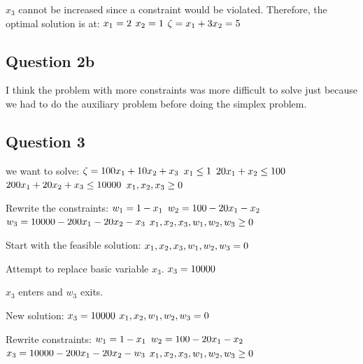 \documentclass[17pt]{extarticle}
\begin{document}
\bigskip $x_3$ cannot be increased since a constraint would be violated. Therefore, the optimal solution is at:
$\\ x_1 = 2$
$\\ x_2 = 1$
$\\ \zeta = x_1 + 3x_2 = 5$


\newpage
\subsection*{Question 2b}
I think the problem with more constraints was more difficult to solve just because we had to do the auxiliary problem before doing the simplex problem.

\newpage
\subsection*{Question 3}
we want to solve:
$\\ \zeta = 100x_1 + 10x_2 + x_3$
$\\ x_1 \leq 1$
$\\ 20x_1 + x_2 \leq 100$
$\\ 200x_1 + 20x_2 + x_3 \leq 10000$
$\\ x_1, x_2, x_3 \geq 0$

\bigskip Rewrite the constraints:
$\\ w_1 = 1 - x_1$
$\\ w_2 = 100 - 20x_1 - x_2$
$\\ w_3 = 10000 - 200x_1 - 20x_2 - x_3$
$\\ x_1, x_2, x_3, w_1, w_2, w_3 \geq 0$

\bigskip Start with the feasible solution:
$\\ x_1, x_2, x_3, w_1, w_2, w_3 = 0$

\bigskip Attempt to replace basic variable $x_3$.
$\\ x_3 = 10000$

\bigskip $x_3$ enters and $w_3$ exits.

\bigskip New solution:
$\\ x_3 = 10000$
$\\ x_1, x_2, w_1, w_2, w_3 = 0$


\bigskip Rewrite constraints:
$\\ w_1 = 1 - x_1$
$\\ w_2 = 100 - 20x_1 - x_2$
$\\ x_3 = 10000 - 200x_1 - 20x_2 - w_3$
$\\ x_1, x_2, x_3, w_1, w_2, w_3 \geq 0$
\end{document}
